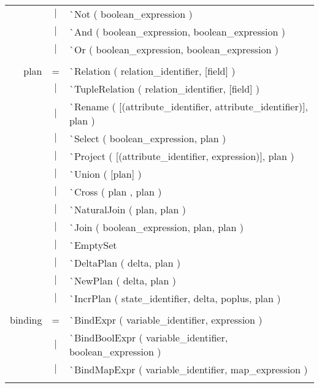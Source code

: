 \documentclass{article}
\begin{document}
\begin{tabular}[ht] {rcl}
&$\lvert$ & \`{}Not ( boolean\_expression )\\
&$\lvert$ & \`{}And ( boolean\_expression,  boolean\_expression )\\
&$\lvert$ & \`{}Or ( boolean\_expression,  boolean\_expression )\\
\\
plan &=& \`{}Relation ( relation\_identifier, [field] )\\
&$\lvert$ & \`{}TupleRelation ( relation\_identifier, [field] )\\
&$\lvert$ & \`{}Rename ( [(attribute\_identifier, attribute\_identifier)], plan ) \\
&$\lvert$ & \`{}Select ( boolean\_expression, plan )\\
&$\lvert$ & \`{}Project ( [(attribute\_identifier, expression)], plan )\\
&$\lvert$ & \`{}Union ( [plan] )\\
&$\lvert$ & \`{}Cross ( plan , plan )\\
&$\lvert$ & \`{}NaturalJoin ( plan,  plan )\\
&$\lvert$ & \`{}Join ( boolean\_expression,  plan,  plan )\\
&$\lvert$ & \`{}EmptySet \\
&$\lvert$ & \`{}DeltaPlan ( delta, plan )\\
&$\lvert$ & \`{}NewPlan ( delta, plan )\\
&$\lvert$ & \`{}IncrPlan ( state\_identifier, delta, poplus, plan ) \\
\\
binding &=& \`{}BindExpr ( variable\_identifier,  expression )\\
&$\lvert$ & \`{}BindBoolExpr ( variable\_identifier,  boolean\_expression )\\
&$\lvert$ & \`{}BindMapExpr ( variable\_identifier, map\_expression ) \\
\\
\end{tabular}
\pagebreak
\end{document}
